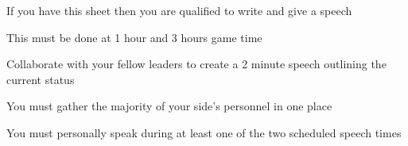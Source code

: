 \documentclass[green]{guildcamp3}
\begin{document}
	
	\name{\gSpeech{}}
	
	
	
	
	
	If you have this sheet then you are qualified to write and give a speech 
	
	
	
	
	\begin{enum}[Directions]
		\item This must be done at 1 hour and 3 hours game time
		\item Collaborate with your fellow leaders to create a 2 minute speech outlining the current status
		\item You must gather the majority of your side's personnel in one place
		\item You must personally speak during at least one of the two scheduled speech times

		
		
	\end{enum}
	
\end{document}

